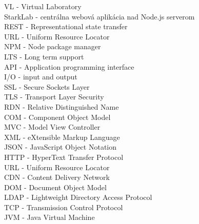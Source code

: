 VL - Virtual Laboratory\\
StarkLab - centrálna webová aplikácia nad Node.js serverom\\
REST - Representational state transfer\\
URL - Uniform Resource Locator\\
NPM - Node package manager\\
LTS - Long term support\\
API - Application programming interface\\
I/O - input and output\\
SSL - Secure Sockets Layer\\
TLS - Transport Layer Security\\
RDN - Relative Distinguished Name\\
COM - Component Object Model\\
MVC - Model View Controller\\
XML - eXtensible Markup Language\\
JSON - JavaScript Object Notation\\
HTTP - HyperText Transfer Protocol\\
URL - Uniform Resource Locator\\
CDN - Content Delivery Network\\
DOM - Document Object Model\\
LDAP - Lightweight Directory Access Protocol\\
TCP - Transmission Control Protocol\\
JVM - Java Virtual Machine\\


